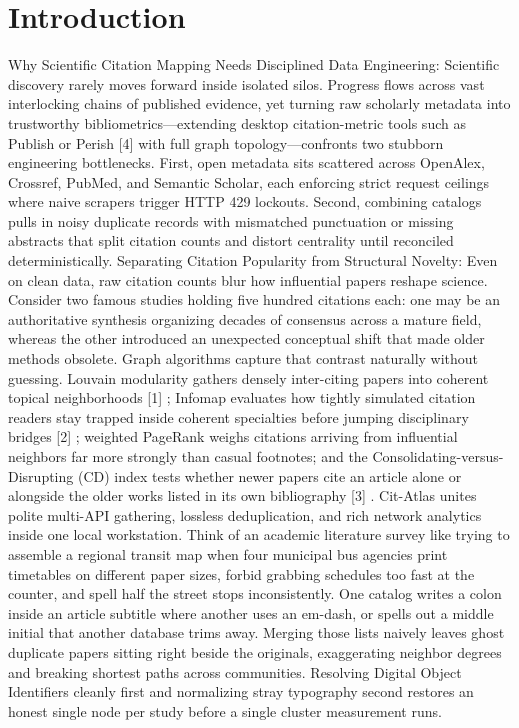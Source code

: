 \documentclass[10pt,letterpaper]{article}
\begin{document}
\section{Introduction}
Why Scientific Citation Mapping Needs Disciplined Data Engineering: Scientific discovery rarely moves forward inside isolated silos. Progress flows across vast interlocking chains of published evidence, yet turning raw scholarly metadata into trustworthy bibliometrics---extending desktop citation-metric tools such as Publish or Perish [4] with full graph topology---confronts two stubborn engineering bottlenecks. First, open metadata sits scattered across OpenAlex, Crossref, PubMed, and Semantic Scholar, each enforcing strict request ceilings where naive scrapers trigger HTTP 429 lockouts. Second, combining catalogs pulls in noisy duplicate records with mismatched punctuation or missing abstracts that split citation counts and distort centrality until reconciled deterministically. Separating Citation Popularity from Structural Novelty: Even on clean data, raw citation counts blur how influential papers reshape science. Consider two famous studies holding five hundred citations each: one may be an authoritative synthesis organizing decades of consensus across a mature field, whereas the other introduced an unexpected conceptual shift that made older methods obsolete. Graph algorithms capture that contrast naturally without guessing. Louvain modularity gathers densely inter-citing papers into coherent topical neighborhoods [1] ; Infomap evaluates how tightly simulated citation readers stay trapped inside coherent specialties before jumping disciplinary bridges [2] ; weighted PageRank weighs citations arriving from influential neighbors far more strongly than casual footnotes; and the Consolidating-versus-Disrupting (CD) index tests whether newer papers cite an article alone or alongside the older works listed in its own bibliography [3] . Cit-Atlas unites polite multi-API gathering, lossless deduplication, and rich network analytics inside one local workstation. Think of an academic literature survey like trying to assemble a regional transit map when four municipal bus agencies print timetables on different paper sizes, forbid grabbing schedules too fast at the counter, and spell half the street stops inconsistently. One catalog writes a colon inside an article subtitle where another uses an em-dash, or spells out a middle initial that another database trims away. Merging those lists naively leaves ghost duplicate papers sitting right beside the originals, exaggerating neighbor degrees and breaking shortest paths across communities. Resolving Digital Object Identifiers cleanly first and normalizing stray typography second restores an honest single node per study before a single cluster measurement runs.
\end{document}
